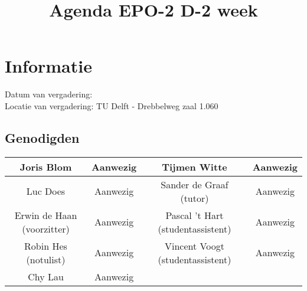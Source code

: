 \documentclass{article}
\begin{document}
\title{Agenda EPO-2 D-2 week }%
\author{}%
\maketitle

\section*{Informatie}
Datum van vergadering: \\ %
Locatie van vergadering: TU Delft - Drebbelweg zaal 1.060 %
\subsection*{Genodigden}
\begin{center}
\begin{tabular}{|c |c |c |c |}
	\hline
	Joris Blom & Aanwezig & Tijmen Witte & Aanwezig \\
	\hline
	Luc Does & Aanwezig & Sander de Graaf (tutor) & Aanwezig \\
	\hline
	Erwin de Haan (voorzitter) & Aanwezig & Pascal 't Hart (studentassistent) & Aanwezig \\
	\hline
	Robin Hes (notulist) & Aanwezig & Vincent Voogt (studentassistent) & Aanwezig \\
	\hline
	Chy Lau & Aanwezig & & \\
	\hline
\end{tabular}
\end{center}
\end{document}
